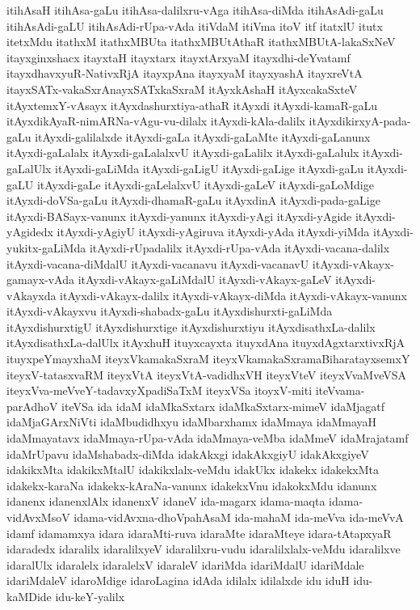 {itihAsaH
itihAsa-gaLu
itihAsa-dalilxru-vAga
itihAsa-diMda
itihAsAdi-gaLu
itihAsAdi-gaLU
itihAsAdi-rUpa-vAda
itiVdaM
itiVma
itoV
itf
itatxlU
itutx
itetxMdu
itathxM
itathxMBUta
itathxMBUtAthaR
itathxMBUtA-lakaSxNeV
itayxginxshacx
itayxtaH
itayxtarx
itayxtArxyaM
itayxdhi-deYvatamf
itayxdhavxyuR-NativxRjA
itayxpAna
itayxyaM
itayxyashA
itayxreVtA
itayxSATx-vakaSxrAnayxSATxkaSxraM
itAyxkAshaH
itAyxcakaSxteV
itAyxtemxY-vAsayx
itAyxdashurxtiya-athaR
itAyxdi
itAyxdi-kamaR-gaLu
itAyxdikAyaR-nimARNa-vAgu-vu-dilalx
itAyxdi-kAla-dalilx
itAyxdikirxyA-pada-gaLu
itAyxdi-galilalxde
itAyxdi-gaLa
itAyxdi-gaLaMte
itAyxdi-gaLanunx
itAyxdi-gaLalalx
itAyxdi-gaLalalxvU
itAyxdi-gaLalilx
itAyxdi-gaLalulx
itAyxdi-gaLalUlx
itAyxdi-gaLiMda
itAyxdi-gaLigU
itAyxdi-gaLige
itAyxdi-gaLu
itAyxdi-gaLU
itAyxdi-gaLe
itAyxdi-gaLelalxvU
itAyxdi-gaLeV
itAyxdi-gaLoMdige
itAyxdi-doVSa-gaLu
itAyxdi-dhamaR-gaLu
itAyxdinA
itAyxdi-pada-gaLige
itAyxdi-BASayx-vanunx
itAyxdi-yanunx
itAyxdi-yAgi
itAyxdi-yAgide
itAyxdi-yAgidedx
itAyxdi-yAgiyU
itAyxdi-yAgiruva
itAyxdi-yAda
itAyxdi-yiMda
itAyxdi-yukitx-gaLiMda
itAyxdi-rUpadalilx
itAyxdi-rUpa-vAda
itAyxdi-vacana-dalilx
itAyxdi-vacana-diMdalU
itAyxdi-vacanavu
itAyxdi-vacanavU
itAyxdi-vAkayx-gamayx-vAda
itAyxdi-vAkayx-gaLiMdalU
itAyxdi-vAkayx-gaLeV
itAyxdi-vAkayxda
itAyxdi-vAkayx-dalilx
itAyxdi-vAkayx-diMda
itAyxdi-vAkayx-vanunx
itAyxdi-vAkayxvu
itAyxdi-shabadx-gaLu
itAyxdishurxti-gaLiMda
itAyxdishurxtigU
itAyxdishurxtige
itAyxdishurxtiyu
itAyxdisathxLa-dalilx
itAyxdisathxLa-dalUlx
itAyxhuH
ituyxcayxta
ituyxdAna
ituyxdAgxtarxtivxRjA
ituyxpeYmayxhaM
iteyxVkamakaSxraM
iteyxVkamakaSxramaBiharatayxsemxY
iteyxV-tatasxvaRM
iteyxVtA
iteyxVtA-vadidhxVH
iteyxVteV
iteyxVvaMveVSA
iteyxVva-meVveY-tadavxyXpadiSaTxM
iteyxVSa
itoyxV-miti
iteVvama-parAdhoV
iteVSa
ida
idaM
idaMkaSxtarx
idaMkaSxtarx-mimeV
idaMjagatf
idaMjaGArxNiVti
idaMbudidhxyu
idaMbarxhamx
idaMmaya
idaMmayaH
idaMmayatavx
idaMmaya-rUpa-vAda
idaMmaya-veMba
idaMmeV
idaMrajatamf
idaMrUpavu
idaMshabadx-diMda
idakAkxgi
idakAkxgiyU
idakAkxgiyeV
idakikxMta
idakikxMtalU
idakikxlalx-veMdu
idakUkx
idakekx
idakekxMta
idakekx-karaNa
idakekx-kAraNa-vanunx
idakekxVnu
idakokxMdu
idanunx
idanenx
idanenxlAlx
idanenxV
idaneV
ida-magarx
idama-maqta
idama-vidAvxMsoV
idama-vidAvxna-dhoVpahAsaM
ida-mahaM
ida-meVva
ida-meVvA
idamf
idamamxya
idara
idaraMti-ruva
idaraMte
idaraMteye
idara-tAtapxyaR
idaradedx
idaralilx
idaralilxyeV
idaralilxru-vudu
idaralilxlalx-veMdu
idaralilxve
idaralUlx
idaralelx
idaralelxV
idaraleV
idariMda
idariMdalU
idariMdale
idariMdaleV
idaroMdige
idaroLagina
idAda
idilalx
idilalxde
idu
iduH
idu-kaMDide
idu-keY-yalilx
}
